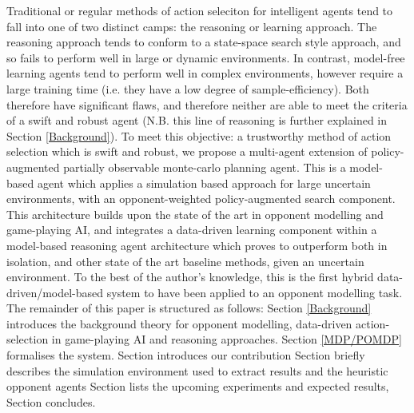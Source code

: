 \newline \newline
Traditional or regular methods of action seleciton for intelligent agents tend to fall into one of two distinct camps: the reasoning or learning approach. The reasoning approach tends to conform to a state-space search style approach, and so fails to perform well in large or dynamic environments. In contrast, model-free learning agents tend to perform well in complex environments, however require a large training time (i.e. they have a low degree of sample-efficiency). Both therefore have significant flaws, and therefore neither are able to meet the criteria of a swift and robust agent (N.B. this line of reasoning is further explained in Section \ref{Background}). 
\newline \newline
To meet this objective: a trustworthy method of action selection which is swift and robust, we propose a multi-agent extension of policy-augmented partially observable monte-carlo planning agent. This is a model-based agent which applies a simulation based approach for large uncertain environments, with an opponent-weighted policy-augmented search component. This architecture builds upon the state of the art in opponent modelling and game-playing AI, and integrates a data-driven learning component within a model-based reasoning agent architecture which proves to outperform both in isolation, and other state of the art baseline methods, given an uncertain environment. To the best of the author's knowledge, this is the first hybrid data-driven/model-based system to have been applied to an opponent modelling task. 
\newline \newline
The remainder of this paper is structured as follows: Section \ref{Background} introduces the background theory for opponent modelling, data-driven action-selection in game-playing AI and reasoning approaches. 
Section \ref{MDP/POMDP} formalises the system. 
Section introduces our contribution
Section briefly describes the simulation environment used to extract results and the heuristic opponent agents
Section lists the upcoming experiments and expected results, 
Section concludes. 